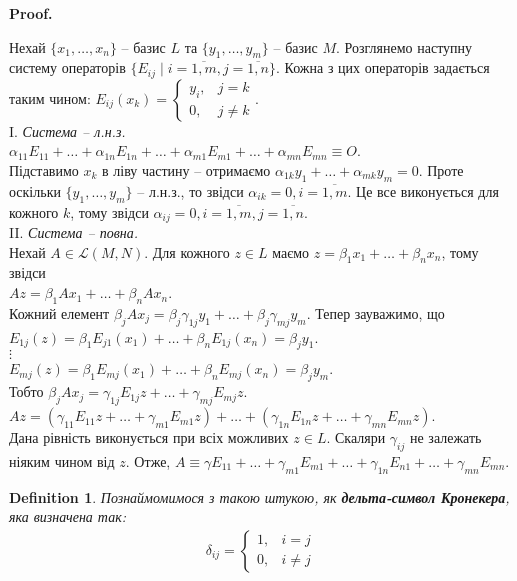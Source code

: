 \documentclass[a4paper, 10pt]{article}
\makeatletter
\theoremstyle{theoremdd}
\newtheorem{definition}[theorem]{Definition}
\renewenvironment{proof}[1][Proof.\\]{\par
\pushQED{\hfill \qed}%
\normalfont \topsep6\p@\@plus6\p@\relax
\trivlist
\item\relax
{\bfseries
#1\@addpunct{.}}\hspace\labelsep\ignorespaces
}{%
\popQED\endtrivlist\@endpefalse
}
\makeatother
\begin{document}
	\begin{proof}
	Нехай $\{x_1,\dots,x_n\}$ -- базис $L$ та $\{y_1,\dots,y_m\}$ -- базис $M$. Розглянемо наступну систему операторів $\{E_{ij} \mid i = \overline{1,m}, j = \overline{1,n}\}$. Кожна з цих операторів задається таким чином: $E_{ij}(x_k) = \begin{cases} y_i, & j = k \\ 0, & j \neq k \end{cases}$.\\
	I. \textit{Система -- л.н.з.}\\
	$\alpha_{11} E_{11} + \dots + \alpha_{1n} E_{1n} + \dots + \alpha_{m1} E_{m1} + \dots + \alpha_{mn} E_{mn} \equiv O$.\\
	Підставимо $x_k$ в ліву частину -- отримаємо $\alpha_{1k} y_1 + \dots + \alpha_{mk} y_m = 0$. Проте оскільки $\{y_1,\dots,y_m\}$ -- л.н.з., то звідси $\alpha_{ik} = 0, i = \overline{1,m}$. Це все виконується для кожного $k$, тому звідси $\alpha_{ij} = 0, i = \overline{1,m}, j = \overline{1,n}$.
	\bigskip \\
	II. \textit{Система -- повна.}\\
	Нехай $A \in \mathcal{L}(M,N)$. Для кожного $z \in L$ маємо $z = \beta_1 x_1 + \dots + \beta_n x_n$, тому звідси\\
	$Az = \beta_1 Ax_1 + \dots + \beta_n Ax_n$.\\
	Кожний елемент $\beta_j Ax_j = \beta_j \gamma_{1j} y_1 + \dots + \beta_j \gamma_{mj} y_m$. Тепер зауважимо, що \\
	$E_{1j}(z) = \beta_1 E_{j1}(x_1) + \dots + \beta_n E_{1j}(x_n) = \beta_j y_1$.\\
	$\vdots$\\
	$E_{mj}(z) = \beta_1 E_{mj}(x_1) + \dots + \beta_n E_{mj}(x_n) = \beta_j y_m$.\\
	Тобто $\beta_j Ax_j = \gamma_{1j} E_{1j} z + \dots + \gamma_{mj} E_{mj} z$.\\
	$Az = (\gamma_{11} E_{11} z + \dots + \gamma_{m1} E_{m1}z) + \dots + (\gamma_{1n} E_{1n}z + \dots + \gamma_{mn} E_{mn}z)$.\\
	Дана рівність виконується при всіх можливих $z \in L$. Скаляри $\gamma_{ij}$ не залежать ніяким чином від $z$. Отже, $A \equiv \gamma E_{11} + \dots + \gamma_{m1} E_{m1} + \dots + \gamma_{1n} E_{n1} + \dots + \gamma_{mn} E_{mn}$.
	\end{proof}
	
	\begin{definition}
Познаймомимося з такою штукою, як \textbf{дельта-символ Кронекера}, яка визначена так:
\begin{align*}
\delta_{ij} = \begin{cases} 1, & i = j \\ 0, & i \neq j\end{cases} 
\end{align*}
	\end{definition}
	
\end{document}
